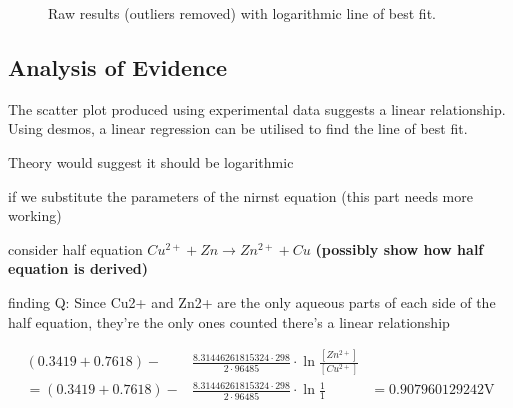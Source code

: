 \documentclass[11pt,a4paper]{article}
\begin{document}
\begin{figure}[h]
	\centering
	\caption{Raw results (outliers removed) with logarithmic line of best fit.}
\end{figure}


\subsection{Analysis of Evidence}
The scatter plot produced using experimental data suggests a linear relationship. Using desmos, a linear regression can be utilised to find the line of best fit. 





Theory would suggest it should be logarithmic 

if we substitute the parameters of the nirnst equation (this part needs more working)

consider half equation $Cu^{2+}+Zn \rightarrow Zn^{2+} + Cu$ \textbf{(possibly show how half equation is derived)}

finding Q: Since Cu2+ and Zn2+ are the only aqueous parts of each side of the half equation, they're the only ones counted
there's a linear relationship

\begin{align*}
	(0.3419+0.7618)-&\frac{8.31446261815324\cdot298}{2\cdot96485}\cdot\ln\frac{[Zn^{2+}]}{[Cu^{2+}]}\\
	=(0.3419+0.7618)-&\frac{8.31446261815324\cdot298}{2\cdot96485}\cdot\ln\frac{1}{1}
	&=0.907960129242\textrm{V}
\end{align*}
\end{document}
